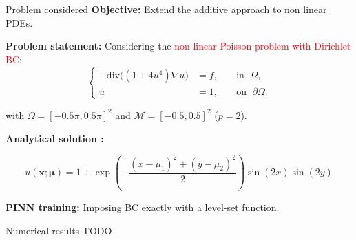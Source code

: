\begin{frame}{Problem considered}	
    \textbf{Objective:} Extend the additive approach to non linear PDEs.

    \vspace{5pt}

    \textbf{Problem statement:} Considering the \textcolor{red}{non linear Poisson problem with Dirichlet BC}:
    \vspace{-5pt}
    \begin{equation*}
        \left\{
        \begin{aligned}
            -\text{div}\big((1+4u^4)\nabla u\big) & = f, \; &  & \text{in } \; \Omega, \\
            u         & = 1, \;  &  & \text{on } \; \partial\Omega.
        \end{aligned}
        \right.
    \end{equation*}

    with $\Omega=[-0.5\pi,0.5\pi]^2$ and $\mathcal{M}=[-0.5,0.5]^2$ ($p=2$).

    \vspace{5pt}
	\textbf{Analytical solution :}

	\vspace{-12pt}
	\begin{equation*}
		u(\bm{x};\bm{\mu})= 1 + \exp\left(-\frac{(x-\mu_1)^2+(y-\mu_2)^2}{2}\right)\sin(2x)\sin(2y)
	\end{equation*}
	\vspace{-5pt}
	
    \vspace{5pt}
	\textbf{PINN training:} Imposing BC exactly with a level-set function.
\end{frame}

\begin{frame}{Numerical results}	
    TODO
\end{frame}